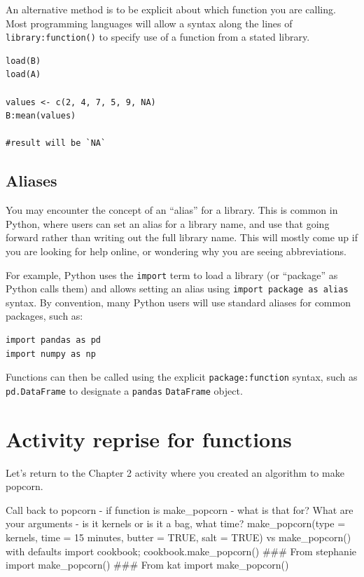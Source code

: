 \documentclass[
]{book}
\begin{document}
An alternative method is to be explicit about which function you are calling. Most programming languages will allow a syntax along the lines of \texttt{library:function()} to specify use of a function from a stated library.\\

\begin{verbatim}
load(B)
load(A)

values <- c(2, 4, 7, 5, 9, NA)
B:mean(values)

#result will be `NA`
\end{verbatim}

\subsection{Aliases}\label{aliases}

You may encounter the concept of an ``alias'' for a library. This is common in Python, where users can set an alias for a library name, and use that going forward rather than writing out the full library name. This will mostly come up if you are looking for help online, or wondering why you are seeing abbreviations.

For example, Python uses the \texttt{import} term to load a library (or ``package'' as Python calls them) and allows setting an alias using \texttt{import\ package\ as\ alias} syntax. By convention, many Python users will use standard aliases for common packages, such as:

\begin{verbatim}
import pandas as pd
import numpy as np
\end{verbatim}

Functions can then be called using the explicit \texttt{package:function} syntax, such as \texttt{pd.DataFrame} to designate a \texttt{pandas} \texttt{DataFrame} object.

\section{Activity reprise for functions}\label{activity-reprise-for-functions}

Let's return to the Chapter 2 activity where you created an algorithm to make popcorn.

Call back to popcorn - if function is make\_popcorn - what is that for? What are your arguments - is it kernels or is it a bag, what time?
make\_popcorn(type = kernels, time = 15 minutes, butter = TRUE, salt = TRUE) vs make\_popcorn() with defaults
import cookbook; cookbook.make\_popcorn()
\#\#\# From stephanie import make\_popcorn()
\#\#\# From kat import make\_popcorn()
\end{document}
